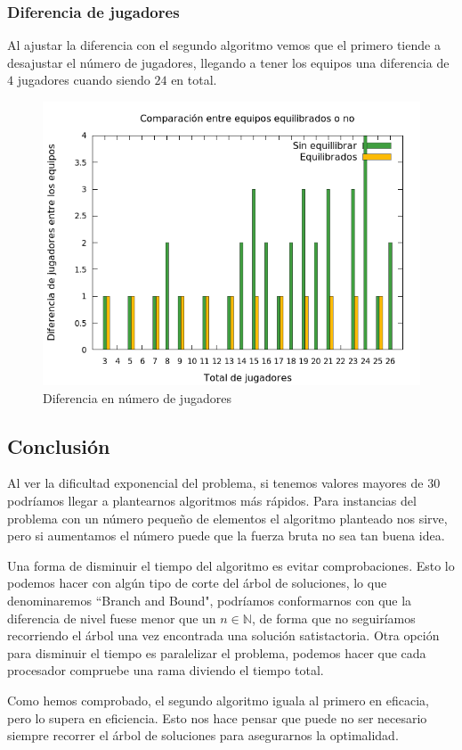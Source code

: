 \subsubsection{Diferencia de jugadores}
Al ajustar la diferencia con el segundo algoritmo vemos que el primero tiende a desajustar el número de jugadores, llegando a tener los equipos una diferencia de $4$ jugadores cuando siendo $24$ en total.

\begin{figure}[H]
    \centering
    \includegraphics[scale=0.5]{../Equipos/Graficas/separacion.png}
    \caption{Diferencia en número de jugadores}
    \label{fig:Sin equilibrar}
\end{figure}

\subsection{Conclusión}
Al ver la dificultad exponencial del problema, si tenemos valores mayores de $30$ podríamos llegar a plantearnos algoritmos más rápidos. 
Para instancias del problema con un número pequeño de elementos el algoritmo planteado nos sirve, pero si aumentamos el número puede que la fuerza bruta no sea tan buena idea.

Una forma de disminuir el tiempo del algoritmo es evitar comprobaciones. 
Esto lo podemos hacer con algún tipo de corte del árbol de soluciones, lo que denominaremos ``Branch and Bound", podríamos conformarnos con que la diferencia de nivel fuese menor que un $n\in\mathbb{N}$, de forma que no seguiríamos recorriendo el árbol una vez encontrada una solución satistactoria. 
Otra opción para disminuir el tiempo es paralelizar el problema, podemos hacer que cada procesador compruebe una rama diviendo el tiempo total.

Como hemos comprobado, el segundo algoritmo iguala al primero en eficacia, pero lo supera en eficiencia. 
Esto nos hace pensar que puede no ser necesario siempre recorrer el árbol de soluciones para asegurarnos la optimalidad.
